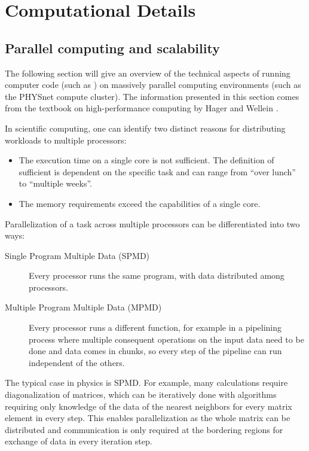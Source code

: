 \documentclass[main.tex]{subfiles}
\begin{document}
\chapter{Computational Details\label{ch:computation}}

\section{Parallel computing and scalability\label{sec:parallel_computing}}

The following section will give an overview of the technical aspects of running computer code (such as \QE) on massively parallel computing environments (such as the PHYSnet compute cluster).
The information presented in this section comes from the textbook on high-performance computing by Hager and Wellein \cite{hager_introduction_2010}.

In scientific computing, one can identify two distinct reasons for distributing workloads to multiple processors:
\begin{itemize}
    \item The execution time on a single core is not sufficient. The definition of sufficient is dependent on the specific task and can range from \enquote{over lunch} to \enquote{multiple weeks}.
    \item The memory requirements exceed the capabilities of a single core.
\end{itemize}

Parallelization of a task across multiple processors can be differentiated into two ways:
\begin{description}
    \item[Single Program Multiple Data (SPMD)] Every processor runs the same program, with data distributed among processors.
    \item[Multiple Program Multiple Data (MPMD)] Every processor runs a different function, for example in a pipelining process where multiple consequent operations on the input data need to be done and data comes in chunks, so every step of the pipeline can run independent of the others.
\end{description}
The typical case in physics is SPMD.
For example, many calculations require diagonalization of matrices, which can be iteratively done with algorithms requiring only knowledge of the data of the nearest neighbors for every matrix element in every step.
This enables parallelization as the whole matrix can be distributed and communication is only required at the bordering regions for exchange of data in every iteration step.
\end{document}
